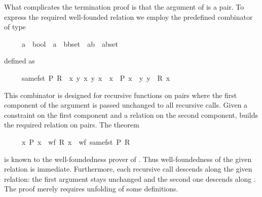 \begin{isabellebody}
\begin{isamarkuptext}
What complicates the termination proof is that the argument of
 is a pair. To express the required well-founded relation
we employ the predefined combinator  of type
\begin{isabelle}%
\ \ \ \ \ {\isacharparenleft}{\isacharprime}a\ {\isasymRightarrow}\ bool{\isacharparenright}\ {\isasymRightarrow}\ {\isacharparenleft}{\isacharprime}a\ {\isasymRightarrow}\ {\isacharparenleft}{\isacharprime}b{\isasymtimes}{\isacharprime}b{\isacharparenright}set{\isacharparenright}\ {\isasymRightarrow}\ {\isacharparenleft}{\isacharparenleft}{\isacharprime}a{\isasymtimes}{\isacharprime}b{\isacharparenright}\ {\isasymtimes}\ {\isacharparenleft}{\isacharprime}a{\isasymtimes}{\isacharprime}b{\isacharparenright}{\isacharparenright}set%
\end{isabelle}
defined as
\begin{isabelle}%
\ \ \ \ \ same{\isacharunderscore}fst\ P\ R\ {\isasymequiv}\ {\isacharbraceleft}{\isacharparenleft}{\isacharparenleft}x{\isacharprime}{\isacharcomma}\ y{\isacharprime}{\isacharparenright}{\isacharcomma}\ x{\isacharcomma}\ y{\isacharparenright}{\isachardot}\ x{\isacharprime}\ {\isacharequal}\ x\ {\isasymand}\ P\ x\ {\isasymand}\ {\isacharparenleft}y{\isacharprime}{\isacharcomma}\ y{\isacharparenright}\ {\isasymin}\ R\ x{\isacharbraceright}%
\end{isabelle}
This combinator is designed for recursive functions on pairs where the first
component of the argument is passed unchanged to all recursive
calls. Given a constraint on the first component and a relation on the second
component,  builds the required relation on pairs.
The theorem \begin{isabelle}%
\ \ \ \ \ {\isacharparenleft}{\isasymAnd}x{\isachardot}\ P\ x\ {\isasymLongrightarrow}\ wf\ {\isacharparenleft}R\ x{\isacharparenright}{\isacharparenright}\ {\isasymLongrightarrow}\ wf\ {\isacharparenleft}same{\isacharunderscore}fst\ P\ R{\isacharparenright}%
\end{isabelle}
is known to the well-foundedness prover of .
Thus well-foundedness of the given relation is immediate.
Furthermore, each recursive call descends along the given relation:
the first argument stays unchanged and the second one descends along
. The proof merely requires unfolding of some definitions.


\end{isamarkuptext}
\end{isabellebody}
